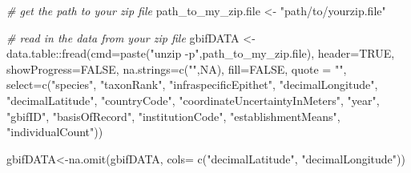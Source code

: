 \documentclass[
]{article}
\newenvironment{Shaded}{\begin{snugshade}}{\end{snugshade}}
\newcommand{\AttributeTok}[1]{\textcolor[rgb]{0.77,0.63,0.00}{#1}}
\newcommand{\CommentTok}[1]{\textcolor[rgb]{0.56,0.35,0.01}{\textit{#1}}}
\newcommand{\ConstantTok}[1]{\textcolor[rgb]{0.00,0.00,0.00}{#1}}
\newcommand{\FunctionTok}[1]{\textcolor[rgb]{0.00,0.00,0.00}{#1}}
\newcommand{\NormalTok}[1]{#1}
\newcommand{\OtherTok}[1]{\textcolor[rgb]{0.56,0.35,0.01}{#1}}
\newcommand{\SpecialCharTok}[1]{\textcolor[rgb]{0.00,0.00,0.00}{#1}}
\newcommand{\StringTok}[1]{\textcolor[rgb]{0.31,0.60,0.02}{#1}}
\begin{document}
\begin{Shaded}
\begin{Highlighting}[]

\CommentTok{\# get the path to your zip file}
\NormalTok{path\_to\_my\_zip.file }\OtherTok{\textless{}{-}} \StringTok{"path/to/yourzip.file"}

\CommentTok{\# read in the data from your zip file}
\NormalTok{gbifDATA }\OtherTok{\textless{}{-}}\NormalTok{ data.table}\SpecialCharTok{::}\FunctionTok{fread}\NormalTok{(}\AttributeTok{cmd=}\FunctionTok{paste}\NormalTok{(}\StringTok{"unzip {-}p"}\NormalTok{,path\_to\_my\_zip.file),}
                                       \AttributeTok{header=}\ConstantTok{TRUE}\NormalTok{,}
                                       \AttributeTok{showProgress=}\ConstantTok{FALSE}\NormalTok{,}
                                       \AttributeTok{na.strings=}\FunctionTok{c}\NormalTok{(}\StringTok{""}\NormalTok{,}\ConstantTok{NA}\NormalTok{),}
                                       \AttributeTok{fill=}\ConstantTok{FALSE}\NormalTok{,}
                                       \AttributeTok{quote =} \StringTok{""}\NormalTok{,}
                                       \AttributeTok{select=}\FunctionTok{c}\NormalTok{(}\StringTok{"species"}\NormalTok{,}
                                               \StringTok{"taxonRank"}\NormalTok{,}
                                               \StringTok{"infraspecificEpithet"}\NormalTok{,}
                                               \StringTok{"decimalLongitude"}\NormalTok{,}
                                               \StringTok{"decimalLatitude"}\NormalTok{,}
                                               \StringTok{"countryCode"}\NormalTok{,}
                                               \StringTok{"coordinateUncertaintyInMeters"}\NormalTok{,}
                                               \StringTok{"year"}\NormalTok{,}
                                               \StringTok{"gbifID"}\NormalTok{,}
                                               \StringTok{"basisOfRecord"}\NormalTok{,}
                                               \StringTok{"institutionCode"}\NormalTok{,}
                                               \StringTok{"establishmentMeans"}\NormalTok{,}
                                               \StringTok{"individualCount"}\NormalTok{))}

\NormalTok{gbifDATA}\OtherTok{\textless{}{-}}\FunctionTok{na.omit}\NormalTok{(gbifDATA, }\AttributeTok{cols=} \FunctionTok{c}\NormalTok{(}\StringTok{"decimalLatitude"}\NormalTok{, }\StringTok{"decimalLongitude"}\NormalTok{))}


\end{Highlighting}
\end{Shaded}
\end{document}
